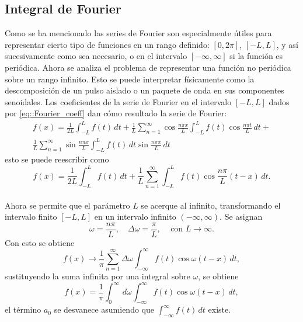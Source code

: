 \documentclass[a4paper]{article}
\begin{document}
\subsection{Integral de Fourier}
Como se ha mencionado las series de Fourier son especialmente útiles para representar cierto tipo de funciones en un rango definido: $[0,2\pi]$, $[-L,L]$, y así sucesivamente como sea necesario, o en el intervalo $[-\infty,\infty]$ si la función es periódica. Ahora se analiza el problema de representar una función no periódica sobre un rango infinito. Esto se puede interpretar físicamente como la descomposición de un pulso aislado o un paquete de onda en sus componentes senoidales. Los coeficientes de la serie de Fourier en el intervalo $[-L,L]$ dados por \ref{eq::Fourier_coeff} dan cómo resultado la serie de Fourier:
\begin{equation}
\begin{aligned}
f(x)=\frac{1}{2L}\int^L_{-L} f(t)\,dt + \frac{1}{L}\sum_{n=1}^\infty \cos{\frac{n\pi x}{L}}\int^L_{-L} f(t) \cos{\frac{n\pi t}{L}}\, dt +\\
 \frac{1}{L}\sum_{n=1}^{\infty}\sin{\frac{n \pi x}{L}}\int^L_{-L} f(t)\,dt \sin\frac{n\pi x }{L}\,dt 
\end{aligned}
\end{equation}
esto se puede reescribir como 
\begin{equation}
f(x)=\frac{1}{2L}\int^L_{-L} f(t)\, dt + \frac{1}{L}\sum^\infty_{n=1}\int^L_{-L} f(t)\cos\frac{n\pi}{L}(t-x)\,dt.
\end{equation}\\
Ahora se permite que el parámetro $L$ se acerque al infinito, transformando el intervalo finito $[-L,L]$ en un intervalo infinito $(-\infty,\infty)$. Se asignan
\begin{equation}
\omega=\frac{n\pi}{L}, \,\,\,\,\,\, \Delta\omega=\frac{\pi}{L},\,\,\,\,\,\,\, \text{con } L\rightarrow\infty.
\end{equation}
Con esto se obtiene 
\begin{equation}
f(x)\rightarrow \frac{1}{\pi}\sum_{n=1}^\infty \Delta\omega \int_{-\infty}^\infty f(t) \cos{\omega(t-x)}\,dt,
\end{equation}
sustituyendo la suma infinita por una integral sobre $\omega$, se obtiene
\begin{equation}\label{eq::Fourier_integral}
f(x)=\frac{1}{\pi}\int_0^\infty\,d\omega \int_{-\infty}^\infty f(t)\cos{\omega(t-x)}\,dt,
\end{equation}
el término $a_0$ se desvanece asumiendo que $\int_{-\infty}^\infty f(t)\,dt$ existe.\\
\end{document}
